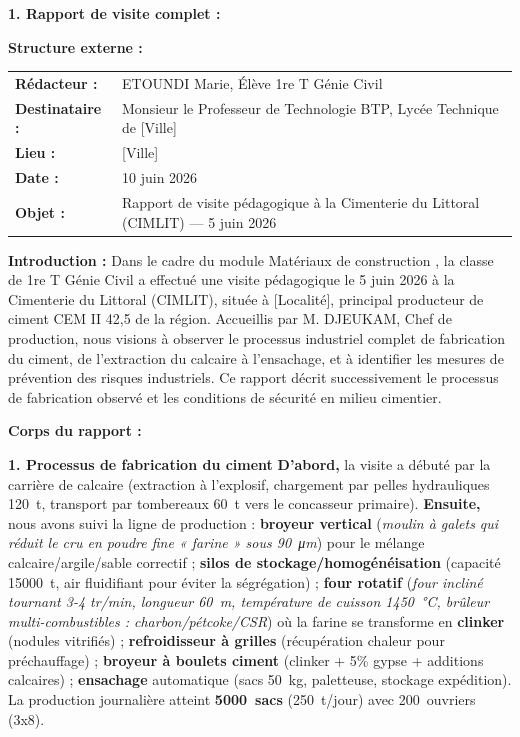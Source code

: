 \documentclass[11pt]{article}
\begin{document}
\begin{exemplebox}
\textbf{1. Rapport de visite complet :}

\textbf{Structure externe :}
\begin{tabularx}{\linewidth}{lX}
\textbf{Rédacteur :} & ETOUNDI Marie, Élève 1re T Génie Civil \\
\textbf{Destinataire :} & Monsieur le Professeur de Technologie BTP, Lycée Technique de [Ville] \\
\textbf{Lieu :} & [Ville] \\
\textbf{Date :} & 10 juin 2026 \\
\textbf{Objet :} & Rapport de visite pédagogique à la Cimenterie du Littoral (CIMLIT) — 5 juin 2026
\end{tabularx}

\textbf{Introduction :}
Dans le cadre du module \og Matériaux de construction \fg, la classe de 1re T Génie Civil a effectué une visite pédagogique le 5 juin 2026 à la Cimenterie du Littoral (CIMLIT), située à [Localité], principal producteur de ciment CEM II 42,5 de la région. Accueillis par M. DJEUKAM, Chef de production, nous visions à observer le processus industriel complet de fabrication du ciment, de l'extraction du calcaire à l'ensachage, et à identifier les mesures de prévention des risques industriels. Ce rapport décrit successivement le processus de fabrication observé et les conditions de sécurité en milieu cimentier.

\textbf{Corps du rapport :}

\textbf{1. Processus de fabrication du ciment}
\textbf{D'abord,} la visite a débuté par la carrière de calcaire (extraction à l'explosif, chargement par pelles hydrauliques \SI{120}{t}, transport par tombereaux \SI{60}{t} vers le concasseur primaire). \textbf{Ensuite,} nous avons suivi la ligne de production : \textbf{broyeur vertical} (\emph{moulin à galets qui réduit le cru en poudre fine « farine » sous \SI{90}{\micro\meter}}) pour le mélange calcaire/argile/sable correctif ; \textbf{silos de stockage/homogénéisation} (capacité \SI{15000}{t}, air fluidifiant pour éviter la ségrégation) ; \textbf{four rotatif} (\emph{four incliné tournant 3-4 tr/min, longueur \SI{60}{m}, température de cuisson \SI{1450}{\celsius}, brûleur multi-combustibles : charbon/pétcoke/CSR}) où la farine se transforme en \textbf{clinker} (nodules vitrifiés) ; \textbf{refroidisseur à grilles} (récupération chaleur pour préchauffage) ; \textbf{broyeur à boulets ciment} (clinker + 5\% gypse + additions calcaires) ; \textbf{ensachage} automatique (sacs \SI{50}{kg}, paletteuse, stockage expédition). La production journalière atteint \textbf{\SI{5000}{sacs}} (\SI{250}{t/jour}) avec \SI{200}{ouvriers} (3x8).


\end{exemplebox}
\end{document}
